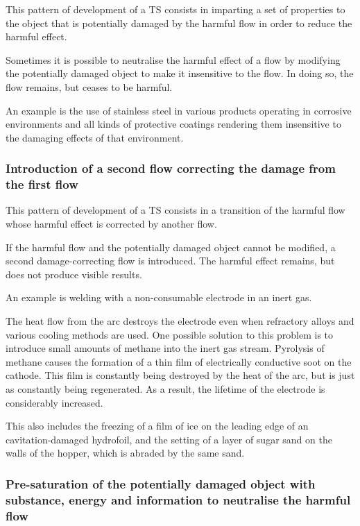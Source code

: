 \documentclass[a4paper,11pt]{article}
\begin{document}
This pattern of development of a TS consists in imparting a set of properties
to the object that is potentially damaged by the harmful flow in order to
reduce the harmful effect.

Sometimes it is possible to neutralise the harmful effect of a flow by
modifying the potentially damaged object to make it insensitive to the flow.
In doing so, the flow remains, but ceases to be harmful.

An example is the use of stainless steel in various products operating in
corrosive environments and all kinds of protective coatings rendering them
insensitive to the damaging effects of that environment.

\subsubsection{Introduction of a second flow correcting the damage from the
  first flow} 

This pattern of development of a TS consists in a transition of the harmful
flow whose harmful effect is corrected by another flow.

If the harmful flow and the potentially damaged object cannot be modified, a
second damage-correcting flow is introduced. The harmful effect remains, but
does not produce visible results.

An example is welding with a non-consumable electrode in an inert gas.

The heat flow from the arc destroys the electrode even when refractory alloys
and various cooling methods are used. One possible solution to this problem is
to introduce small amounts of methane into the inert gas stream. Pyrolysis of
methane causes the formation of a thin film of electrically conductive soot on
the cathode. This film is constantly being destroyed by the heat of the arc,
but is just as constantly being regenerated. As a result, the lifetime of the
electrode is considerably increased.

This also includes the freezing of a film of ice on the leading edge of an
cavitation-damaged hydrofoil, and the setting of a layer of sugar sand on the
walls of the hopper, which is abraded by the same sand.

\subsubsection{Pre-saturation of the potentially damaged object with
  substance, energy and information to neutralise  the harmful flow} 
\end{document}
